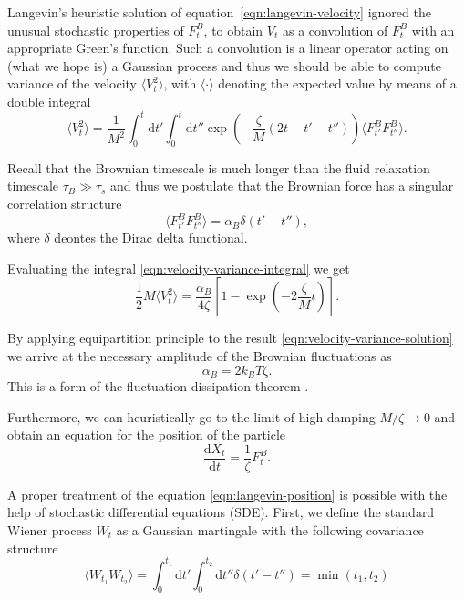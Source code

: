 \documentclass{doctoral}
\newcommand{\dd}{\mathrm{d}}
\begin{document}
Langevin's heuristic solution of equation~\eqref{eqn:langevin-velocity} ignored the unusual stochastic properties of $F^{B}_t$, to obtain $V_t$ as a convolution of $F_t^B$ with an appropriate Green's function.
Such a convolution is a linear operator acting on (what we hope is) a Gaussian process and thus we should be able to compute variance of the velocity $\langle V_t^2 \rangle$, with $\langle \cdot \rangle$ denoting the expected value by means of a double integral
\begin{equation}
    \langle V_t^2 \rangle = \frac{1}{M^2} \int_0^t \dd t' \int_0^t \dd t'' \exp\left( - \frac{\zeta}{M} (2t - t' - t'') \right) \langle F_{t'}^B F_{t''}^B \rangle.
    \label{eqn:velocity-variance-integral}
\end{equation}

Recall that the Brownian timescale is much longer than the fluid relaxation timescale $\tau_B \gg \tau_s$ and thus we postulate that the Brownian force has a singular correlation structure
\begin{equation}
    \langle F_{t'}^B F_{t''}^B \rangle = \alpha_B \delta(t'-t''), \label{eqn:white-noise-langevin}
\end{equation}
where $\delta$ deontes the Dirac delta functional.

Evaluating the integral \eqref{eqn:velocity-variance-integral} we get
\begin{equation}
    \frac{1}{2} M \langle V_t^2 \rangle = \frac{\alpha_B}{4 \zeta} \left[ 1 - \exp \left(-2 \frac{\zeta}{M} t \right) \right].
    \label{eqn:velocity-variance-solution}
\end{equation}

By applying equipartition principle to the result \eqref{eqn:velocity-variance-solution} we arrive at the necessary amplitude of the Brownian fluctuations as
\begin{equation}
    \alpha_B = 2 k_B T \zeta.
    \label{eqn:fluctuation-dissipation-raighley-particle}
\end{equation}
This is a form of the fluctuation-dissipation theorem \cite{van_Kampen_1984,Ottinger_2012}.

Furthermore, we can heuristically go to the limit of high damping $M/\zeta \to 0$ and obtain an equation for the position of the particle
\begin{equation}
    \frac{\dd X_t}{\dd t} = \frac{1}{\zeta} F_t^B.
    \label{eqn:langevin-position}
\end{equation}

A proper treatment of the equation \eqref{eqn:langevin-position} is possible with the help of stochastic differential equations (SDE).
First, we define the standard Wiener process $W_t$ as a Gaussian martingale with the following covariance structure
\begin{equation}
    \langle W_{t_1} W_{t_2} \rangle = \int_0^{t_1} \dd t' \int_0^{t_2} \dd t'' \delta(t' - t'') = \min(t_1, t_2) \label{eqn:wiener-process-definition}
\end{equation}
\end{document}
